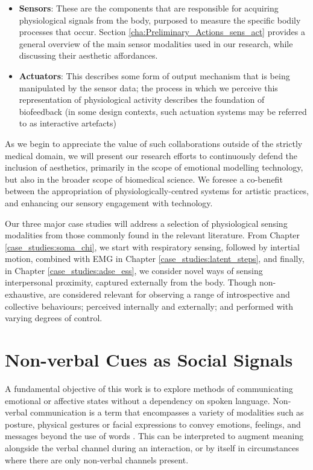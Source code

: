 \begin{itemize}
    \item \textbf{Sensors}: These are the components that are responsible for acquiring physiological signals from the body, purposed to measure the specific bodily processes that occur. Section \ref{cha:Preliminary_Actions_sens_act} provides a general overview of the main sensor modalities used in our research, while discussing their aesthetic affordances.
    \item \textbf{Actuators}: This describes some form of output mechanism that is being manipulated by the sensor data; the process in which we perceive this representation of physiological activity describes the foundation of biofeedback (in some design contexts, such actuation systems may be referred to as interactive artefacts)
\end{itemize}

As we begin to appreciate the value of such collaborations outside of the strictly medical domain, we will present our research efforts to continuously defend the inclusion of aesthetics, primarily in the scope of emotional modelling technology, but also in the broader scope of biomedical science. We foresee a co-benefit between the appropriation of physiologically-centred systems for artistic practices, and enhancing our sensory engagement with technology.

Our three major case studies will address a selection of physiological sensing modalities from those commonly found in the relevant literature. From Chapter \ref{case_studies:soma_chi}, we start with respiratory sensing, followed by intertial motion, combined with EMG in Chapter \ref{case_studies:latent_steps}, and finally, in Chapter \ref{case_studies:adse_ess}, we consider novel ways of sensing interpersonal proximity, captured externally from the body. Though non-exhaustive, are considered relevant for observing a range of introspective and collective behaviours; perceived internally and externally; and performed with varying degrees of control.

\section{Non-verbal Cues as Social Signals}

A fundamental objective of this work is to explore methods of communicating emotional or affective states without a dependency on spoken language. Non-verbal communication is a term that encompasses a variety of modalities such as posture, physical gestures or facial expressions to convey emotions, feelings, and messages beyond the use of words \cite{knapp_nonverbal_2009, richmond_nonverbal_2011}. This can be interpreted to augment meaning alongside the verbal channel during an interaction, or by itself in circumstances where there are only non-verbal channels present.

